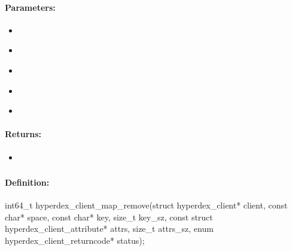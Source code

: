 \paragraph{Parameters:}
\begin{itemize}[noitemsep]
\item {}\\

\item {}\\

\item {}\\

\item {}\\

\item {}\\

\end{itemize}

\paragraph{Returns:}
\begin{itemize}[noitemsep]
\item {}\\

\end{itemize}

\pagebreak
\subsubsection{}
\label{api:c:map_remove}


\paragraph{Definition:}
\begin{ccode}
int64_t hyperdex_client_map_remove(struct hyperdex_client* client,
        const char* space,
        const char* key, size_t key_sz,
        const struct hyperdex_client_attribute* attrs, size_t attrs_sz,
        enum hyperdex_client_returncode* status);
\end{ccode}

